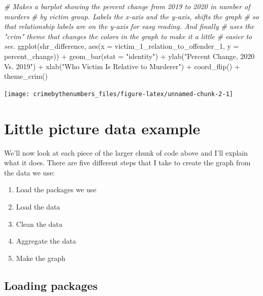 \documentclass[
]{krantz}
\makeatletter
\newenvironment{Shaded}{\begin{snugshade}}{\end{snugshade}}
\newcommand{\AttributeTok}[1]{\textcolor[rgb]{0.61,0.61,0.61}{#1}}
\newcommand{\CommentTok}[1]{\textcolor[rgb]{0.37,0.37,0.37}{\textit{#1}}}
\newcommand{\FunctionTok}[1]{\textcolor[rgb]{0,0,0}{#1}}
\newcommand{\NormalTok}[1]{#1}
\newcommand{\SpecialCharTok}[1]{\textcolor[rgb]{0,0,0}{#1}}
\newcommand{\StringTok}[1]{\textcolor[rgb]{0.5,0.5,0.5}{#1}}
\providecommand{\tightlist}{%
  \setlength{\itemsep}{0pt}\setlength{\parskip}{0pt}}
\newenvironment{kframe}{%
\medskip{}
\setlength{\fboxsep}{.8em}
 \def\at@end@of@kframe{}%
 \ifinner\ifhmode%
  \def\at@end@of@kframe{\end{minipage}}%
  \begin{minipage}{\columnwidth}%
 \fi\fi%
 \def\FrameCommand##1{\hskip\@totalleftmargin \hskip-\fboxsep
 \colorbox{shadecolor}{##1}\hskip-\fboxsep
     \hskip-\linewidth \hskip-\@totalleftmargin \hskip\columnwidth}%
 \MakeFramed {\advance\hsize-\width
   \@totalleftmargin\z@ \linewidth\hsize
   \@setminipage}}%
 {\par\unskip\endMakeFramed%
 \at@end@of@kframe}
\renewenvironment{Shaded}{\begin{kframe}}{\end{kframe}}
\makeatother
\begin{document}
\begin{Shaded}
\begin{Highlighting}[]
\CommentTok{\# Makes a barplot showing the percent change from 2019 to 2020 in number of murders}
\CommentTok{\# by victim group. Labels the x{-}axis and the y{-}axis, shifts the graph}
\CommentTok{\# so that relationship labels are on the y{-}axis for easy reading. And finally}
\CommentTok{\# uses the "crim" theme that changes the colors in the graph to make it a little}
\CommentTok{\# easier to see.}
\FunctionTok{ggplot}\NormalTok{(shr\_difference, }\FunctionTok{aes}\NormalTok{(}\AttributeTok{x =}\NormalTok{ victim\_1\_relation\_to\_offender\_1, }
                                        \AttributeTok{y =}\NormalTok{ percent\_change)) }\SpecialCharTok{+}
  \FunctionTok{geom\_bar}\NormalTok{(}\AttributeTok{stat =} \StringTok{"identity"}\NormalTok{) }\SpecialCharTok{+}
  \FunctionTok{ylab}\NormalTok{(}\StringTok{"Percent Change, 2020 Vs. 2019"}\NormalTok{) }\SpecialCharTok{+}
  \FunctionTok{xlab}\NormalTok{(}\StringTok{"Who Victim Is Relative to Murderer"}\NormalTok{) }\SpecialCharTok{+} 
  \FunctionTok{coord\_flip}\NormalTok{() }\SpecialCharTok{+}
  \FunctionTok{theme\_crim}\NormalTok{() }
\end{Highlighting}
\end{Shaded}

\begin{center}\texttt{[image: crimebythenumbers\_files/figure-latex/unnamed-chunk-2-1]} \end{center}

\hypertarget{little-picture-data-example}{%
\section{Little picture data example}\label{little-picture-data-example}}

We'll now look at each piece of the larger chunk of code above and I'll explain what it does. There are five different steps that I take to create the graph from the data we use:

\begin{enumerate}
\def\labelenumi{\arabic{enumi}.}
\tightlist
\item
  Load the packages we use
\item
  Load the data
\item
  Clean the data
\item
  Aggregate the data
\item
  Make the graph
\end{enumerate}

\hypertarget{loading-packages}{%
\subsection{Loading packages}\label{loading-packages}}
\end{document}
